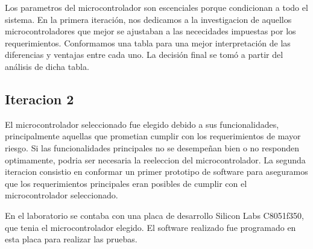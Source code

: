 Los parametros del microcontrolador son escenciales porque condicionan a todo el sistema. En la primera iteración, nos dedicamos a la investigacion de aquellos microcontroladores que mejor se ajustaban a las nececidades impuestas por los requerimientos. Conformamos una tabla para una mejor interpretación de las diferencias y ventajas entre cada uno. La decisión final se tomó a partir del análisis de dicha tabla.



\subsection{Iteracion 2} %
\label{sub:iteracion_2}

El microcontrolador seleccionado fue elegido debido a sus funcionalidades, principalmente aquellas que prometian cumplir con los requerimientos de mayor riesgo. Si las funcionalidades principales no se desempeñan bien o no responden optimamente, podria ser necesaria la reeleccion del microcontrolador. La segunda iteracion consistio en conformar un primer prototipo de software para aseguramos que los requerimientos principales eran posibles de cumplir con el microcontrolador seleccionado.

En el laboratorio se contaba con una placa de desarrollo Silicon Labs C8051f350, que tenia el microcontrolador elegido. El software realizado fue programado en esta placa para realizar las pruebas.


